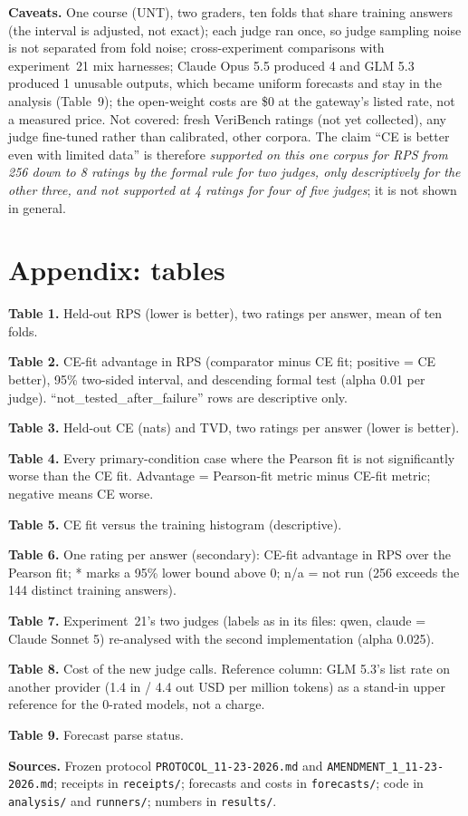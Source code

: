 \documentclass[10pt]{article}
\begin{document}
\textbf{Caveats.} One course (UNT), two graders, ten folds that share training answers (the interval is adjusted, not exact); each judge ran once, so judge sampling noise is not separated from fold noise; cross-experiment comparisons with experiment~21 mix harnesses; Claude Opus 5.5 produced 4 and GLM 5.3 produced 1 unusable outputs, which became uniform forecasts and stay in the analysis (Table~9); the open-weight costs are \$0 at the gateway's listed rate, not a measured price. Not covered: fresh VeriBench ratings (not yet collected), any judge fine-tuned rather than calibrated, other corpora. The claim ``CE is better even with limited data'' is therefore \emph{supported on this one corpus for RPS from 256 down to 8 ratings by the formal rule for two judges, only descriptively for the other three, and not supported at 4 ratings for four of five judges}; it is not shown in general.

\clearpage
{}\pdfpagewidth=29.7cm \pdfpageheight=21cm
\section*{Appendix: tables}
\scriptsize\setlength{\tabcolsep}{2pt}
\textbf{Table 1.} Held-out RPS (lower is better), two ratings per answer, mean of ten folds.\par
\textbf{Table 2.} CE-fit advantage in RPS (comparator minus CE fit; positive = CE better), 95\% two-sided interval, and descending formal test (alpha 0.01 per judge). ``not\_tested\_after\_failure'' rows are descriptive only.\par
\textbf{Table 3.} Held-out CE (nats) and TVD, two ratings per answer (lower is better).\par
\textbf{Table 4.} Every primary-condition case where the Pearson fit is not significantly worse than the CE fit. Advantage = Pearson-fit metric minus CE-fit metric; negative means CE worse.\par
\textbf{Table 5.} CE fit versus the training histogram (descriptive).\par
\textbf{Table 6.} One rating per answer (secondary): CE-fit advantage in RPS over the Pearson fit; * marks a 95\% lower bound above 0; n/a = not run (256 exceeds the 144 distinct training answers).\par
\textbf{Table 7.} Experiment~21's two judges (labels as in its files: qwen, claude = Claude Sonnet 5) re-analysed with the second implementation (alpha 0.025).\par
\clearpage
\textbf{Table 8.} Cost of the new judge calls. Reference column: GLM 5.3's list rate on another provider (1.4 in / 4.4 out USD per million tokens) as a stand-in upper reference for the 0-rated models, not a charge.\par
\textbf{Table 9.} Forecast parse status.\par

\textbf{Sources.} Frozen protocol \texttt{PROTOCOL\_11-23-2026.md} and \texttt{AMENDMENT\_1\_11-23-2026.md}; receipts in \texttt{receipts/}; forecasts and costs in \texttt{forecasts/}; code in \texttt{analysis/} and \texttt{runners/}; numbers in \texttt{results/}.
\end{document}
